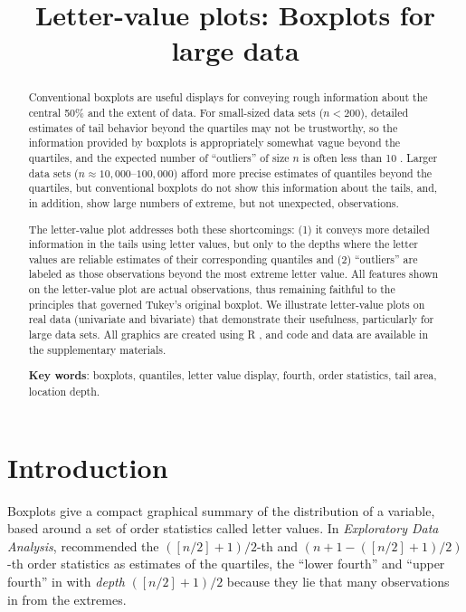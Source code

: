 \documentclass[12pt,oneside]{article}
\title{Letter-value plots: Boxplots for large data}
\begin{document}
\maketitle

\begin{abstract}

  Conventional boxplots \citep{eda} are useful displays for conveying rough
  information about the central 50\% and the extent of data. For small-sized
  data sets ($n < 200$), detailed estimates of tail behavior beyond the
  quartiles may not be trustworthy, so the information provided by boxplots is
  appropriately somewhat vague beyond the quartiles, and the expected number
  of ``outliers'' of size $n$ is often less than 10 \citep{dchbox}. Larger
  data sets ($n \approx 10,000$--$100,000$) afford more precise estimates of
  quantiles beyond the quartiles, but conventional boxplots do not show this
  information about the tails, and, in addition, show large numbers of
  extreme, but not unexpected, observations.

  The letter-value plot addresses both these shortcomings: (1) it conveys more
  detailed information in the tails using letter values, but only to the
  depths where the letter values are reliable estimates of their corresponding
  quantiles and (2) ``outliers'' are labeled as those observations beyond the
  most extreme letter value. All features shown on the letter-value plot are
  actual observations, thus remaining faithful to the principles that governed
  Tukey's original boxplot. We illustrate letter-value plots on real data
  (univariate and bivariate) that demonstrate their usefulness, particularly
  for large data sets. All graphics are created using R \citep{R2011}, and
  code and data are available in the supplementary materials.

  \textbf{Key words}: boxplots, quantiles, letter value display, 
  fourth, order statistics, tail area, location depth.
  
\end{abstract}

\section{Introduction}

Boxplots \citep{tukey:1970,tukey72} give a compact graphical summary of the distribution of a variable, based around a set of order statistics called letter values. In \textit{Exploratory Data Analysis}, \citet{eda} recommended the $([n/2] + 1)/2$-th and $(n + 1 - ([n/2] + 1)/2)$-th order statistics as estimates of the quartiles, the ``lower fourth'' and ``upper fourth'' in \citet{ureda} with \textit{depth} $([n/2] + 1)/2$ because they lie that many observations in from the extremes.  
\end{document}
